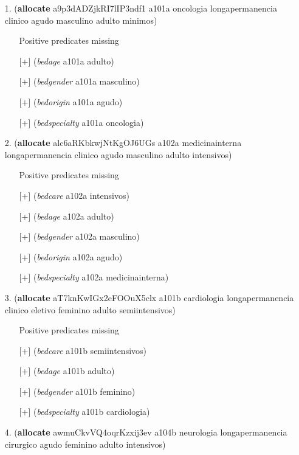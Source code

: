 \documentclass{article}
\begin{document}
\begin{itemize}
\item[1.] (\textbf{allocate} a9p3dADZjkRI7lIP3ndf1 a101a oncologia longapermanencia clinico agudo masculino adulto minimos)
\begin{itemize}
	\item[\textbullet] Positive predicates missing
	\item[\textbullet] [+] (\textit{bedage} a101a adulto)
	\item[\textbullet] [+] (\textit{bedgender} a101a masculino)
	\item[\textbullet] [+] (\textit{bedorigin} a101a agudo)
	\item[\textbullet] [+] (\textit{bedspecialty} a101a oncologia)
\end{itemize}
\item[2.] (\textbf{allocate} alc6aRKbkwjNtKgOJ6UGs a102a medicinainterna longapermanencia clinico agudo masculino adulto intensivos)
\begin{itemize}
	\item[\textbullet] Positive predicates missing
	\item[\textbullet] [+] (\textit{bedcare} a102a intensivos)
	\item[\textbullet] [+] (\textit{bedage} a102a adulto)
	\item[\textbullet] [+] (\textit{bedgender} a102a masculino)
	\item[\textbullet] [+] (\textit{bedorigin} a102a agudo)
	\item[\textbullet] [+] (\textit{bedspecialty} a102a medicinainterna)
\end{itemize}
\item[3.] (\textbf{allocate} aT7knKwIGx2eFOOuX5clx a101b cardiologia longapermanencia clinico eletivo feminino adulto semiintensivos)
\begin{itemize}
	\item[\textbullet] Positive predicates missing
	\item[\textbullet] [+] (\textit{bedcare} a101b semiintensivos)
	\item[\textbullet] [+] (\textit{bedage} a101b adulto)
	\item[\textbullet] [+] (\textit{bedgender} a101b feminino)
	\item[\textbullet] [+] (\textit{bedspecialty} a101b cardiologia)
\end{itemize}
\item[4.] (\textbf{allocate} awmuCkvVQ4oqrKzxij3ev a104b neurologia longapermanencia cirurgico agudo feminino adulto intensivos)

\end{itemize}
\end{document}
